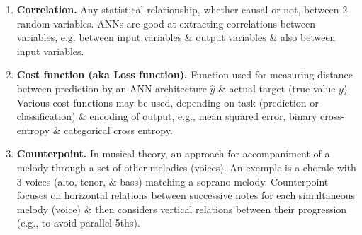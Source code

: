 \documentclass{article}
\begin{document}
\begin{itemize}
\begin{enumerate}
		\item {\bf Correlation.} Any statistical relationship, whether causal or not, between 2 random variables. ANNs are good at extracting correlations between variables, e.g. between input variables \& output variables \& also between input variables.
		\item {\bf Cost function (aka Loss function).} Function used for measuring distance between prediction by an ANN architecture $\hat{y}$ \& actual target (true value $y$). Various cost functions may be used, depending on task (prediction or classification) \& encoding of output, e.g., mean squared error, binary cross-entropy \& categorical cross entropy.
		\item {\bf Counterpoint.} In musical theory, an approach for accompaniment of a melody through a set of other melodies (voices). An example is a chorale with 3 voices (alto, tenor, \& bass) matching a soprano melody. Counterpoint focuses on horizontal relations between successive notes for each simultaneous melody (voice) \& then considers vertical relations between their progression (e.g., to avoid parallel 5ths).


\end{enumerate}
\end{itemize}
\end{document}
